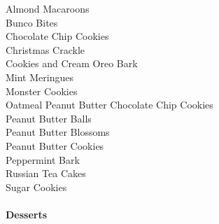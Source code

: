 \documentclass[11pt, twoside, openany]{book}
\begin{document}
Almond Macaroons\hrulefill\pageref{almond-macaroons}\\
Bunco Bites\hrulefill\pageref{bunco-bites}\\
Chocolate Chip Cookies\hrulefill\pageref{chocolate-chip-cookies}\\
Christmas Crackle\hrulefill\pageref{christmas-crackle}\\
Cookies and Cream Oreo Bark\hrulefill\pageref{cookies-and-cream-oreo-bark}\\
Mint Meringues\hrulefill\pageref{mint-meringues}\\
Monster Cookies\hrulefill\pageref{monster-cookies}\\
Oatmeal Peanut Butter Chocolate Chip Cookies\hrulefill\pageref{oatmeal-peanut-butter-chocolate-chip-cookies}\\
Peanut Butter Balls\hrulefill\pageref{peanut-butter-balls}\\
Peanut Butter Blossoms\hrulefill\pageref{peanut-butter-blossoms}\\
Peanut Butter Cookies\hrulefill\pageref{peanut-butter-cookies}\\
Peppermint Bark\hrulefill\pageref{peppermint-bark}\\
Russian Tea Cakes\hrulefill\pageref{russian-tea-cakes}\\
Sugar Cookies\hrulefill\pageref{sugar-cookies}\\
{~\vspace{2mm}\\ \Large \textbf{Desserts}}\hfill\textbf{\pageref{desserts}}
\end{document}
